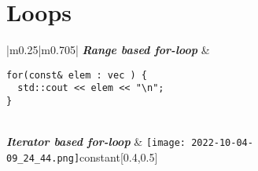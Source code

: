 \documentclass[main.tex,fontsize=8pt,paper=a4,paper=portrait,DIV=calc]{scrartcl}
\begin{document}
\begin{table}[h!]
\section{Loops}
\begin{tabular}{|m{0.25\linewidth}|m{0.705\linewidth}|}
\hline
\textbf{\emph{Range based for-loop}} &
\vspace{2mm}
\begin{lstlisting}
for(const& elem : vec ) {
  std::cout << elem << "\n";
}
\end{lstlisting}\\
\hline
\textbf{\emph{Iterator based for-loop}}
& 
{\texttt{[image: 2022-10-04-09\_24\_44.png]}\newline constant}[0.4,0.5]\\
\hline
\end{tabular}
\end{table}
\pagebreak
\end{document}
